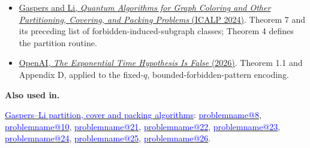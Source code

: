 \documentclass[11pt,a4paper]{article}
\makeatletter
\theoremstyle{problemstyle}
\newenvironment{algorithmindex}[1]{%
  \begin{itemize}[label=\textbullet,leftmargin=1.3em,labelsep=0.6em,itemsep=4pt,topsep=3pt,parsep=0pt]
  \small
}{\end{itemize}}
\newcommand{\problemref}[1]{\hyperref[entry:#1]{\textcolor{blue}{\csname problemname@#1\endcsname}}}
\newcommand{\algorithmref}[2]{\hyperref[algorithm:#1]{\textcolor{blue}{#2}}}
\makeatother
\begin{document}
\begin{algorithmindex}{27}
\item \href{https://arxiv.org/pdf/2311.08042}{Gaspers and Li, \emph{Quantum Algorithms for Graph Coloring and Other Partitioning, Covering, and Packing Problems} (ICALP 2024)}. Theorem 7 and its preceding list of forbidden-induced-subgraph classes; Theorem 4 defines the partition routine.
\item \href{https://github.com/openai/math/blob/main/preprints/The-Exponential-Time-Hypothesis-is-False-October-25-2026/paper.pdf}{OpenAI, \emph{The Exponential Time Hypothesis Is False} (2026)}. Theorem 1.1 and Appendix D, applied to the fixed-$q$, bounded-forbidden-pattern encoding.
\end{algorithmindex}
\par{}\begingroup\small
\textbf{Also used in.}
\par\algorithmref{gaspers-li}{Gaspers--Li partition, cover and packing algorithms}: \problemref{8}, \problemref{10}, \problemref{21}, \problemref{22}, \problemref{23}, \problemref{24}, \problemref{25}, \problemref{26}.
\par\endgroup
\end{document}
